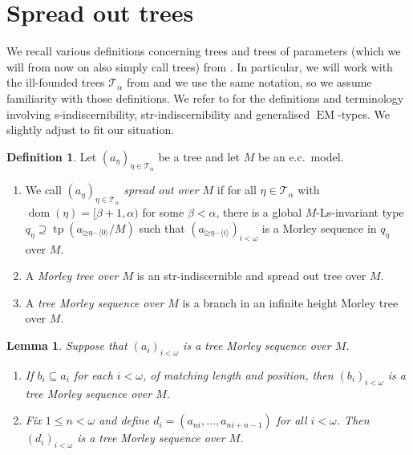 \documentclass[a4paper, reqno]{amsart}
\newtheorem{lemma}[theorem]{Lemma}
\theoremstyle{definition}
\newtheorem{definition}[theorem]{Definition}
\theoremstyle{repeat}
\newcommand{\T}{\mathcal{T}}
\DeclareMathOperator{\tp}{tp}
\DeclareMathOperator{\dom}{dom}
\DeclareMathOperator{\EM}{EM}
\begin{document}
\section{Spread out trees}
\label{sec:spread-out-trees}
We recall various definitions concerning trees and trees of parameters (which we will from now on also simply call trees) from \cite{kaplan_kim-independence_2020}. In particular, we will work with the ill-founded trees $\T_\alpha$ from \cite[Definition 5.1]{kaplan_kim-independence_2020} and we use the same notation, so we assume familiarity with those definitions. We refer to \cite{kamsma_positive_2023} for the definitions and terminology involving s-indiscernibility, str-indiscernibility and generalised $\EM$-types. We slightly adjust \cite[Definition 5.7]{kaplan_kim-independence_2020} to fit our situation.
\begin{definition}
Let $(a_\eta)_{\eta \in \T_\alpha}$ be a tree and let $M$ be an e.c.\ model.
\begin{enumerate}[label=(\roman*)]
\item We call $(a_\eta)_{\eta \in \T_\alpha}$ \emph{spread out over $M$} if for all $\eta \in \T_\alpha$ with $\dom(\eta) = [\beta + 1, \alpha)$ for some $\beta < \alpha$, there is a global $M$-Ls-invariant type $q_\eta \supseteq \tp(a_{\unrhd \eta^\frown \langle 0 \rangle}/M)$ such that $(a_{\unrhd \eta^\frown \langle i \rangle})_{i < \omega}$ is a Morley sequence in $q_\eta$ over $M$.
\item A \emph{Morley tree over $M$} is an str-indiscernible and spread out tree over $M$.
\item A \emph{tree Morley sequence over $M$} is a branch in an infinite height Morley tree over $M$.
\end{enumerate}
\end{definition}
\begin{lemma}
Suppose that $(a_i)_{i < \omega}$ is a tree Morley sequence over $M$.
\begin{enumerate}[label=(\roman*)]
\item If $b_i \subseteq a_i$ for each $i < \omega$, of matching length and position, then $(b_i)_{i < \omega}$ is a tree Morley sequence over $M$.
\item Fix $1 \leq n < \omega$ and define $d_i = (a_{n i}, \ldots, a_{n i + n - 1})$ for all $i < \omega$. Then $(d_i)_{i < \omega}$ is a tree Morley sequence over $M$.
\end{enumerate}
\end{lemma}
\end{document}
